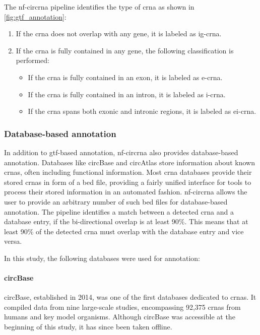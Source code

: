 The \gls{nf-circrna} pipeline identifies the type of \gls{crna} as shown in
\cref{fig:gtf_annotation}: \begin{enumerate} \item If the \gls{crna} does not
            overlap with any gene, it is labeled as \gls{ig-crna}.
      \item If the \gls{crna} is fully contained in any gene, the following
            classification is performed:
            \begin{itemize}
                  \item If the \gls{crna} is fully contained in an exon, it is
                        labeled as \gls{e-crna}.
                  \item If the \gls{crna} is fully contained in an intron, it
                        is
                        labeled as \gls{i-crna}.
                  \item If the \gls{crna} spans both exonic and intronic
                        regions,
                        it is labeled as \gls{ei-crna}.
            \end{itemize}
\end{enumerate}

\subsubsection{Database-based annotation}
\label{sec:database_annotation}
In addition to \gls{gtf}-based annotation, \gls{nf-circrna} also provides
database-based annotation.
Databases like circBase and circAtlas store information about known
\glspl{crna}, often including functional
information\supercite{glazar_circbase_2014,wu_circatlas_2023}.
Most \gls{crna} databases provide their stored \glspl{crna} in form of a
\gls{bed} file, providing a fairly unified interface for tools to process their
stored information in an automated fashion.
\gls{nf-circrna} allows the user to provide an arbitrary number of such
\gls{bed}
files for database-based annotation.
The pipeline identifies a match between a detected \gls{crna} and a database
entry, if the bi-directional overlap is at least 90\%.
This means that at least 90\% of the detected \gls{crna} must overlap with the
database entry and vice versa.

In this study, the following databases were used for annotation:

\paragraph{circBase} circBase, established in 2014, was one of the first
databases dedicated to \glspl{crna}.
It compiled data from nine large-scale studies, encompassing 92,375
\glspl{crna} from humans and key model
organisms\supercite{glazar_circbase_2014}.
Although circBase was accessible at the beginning of this study, it has since
been taken offline.

